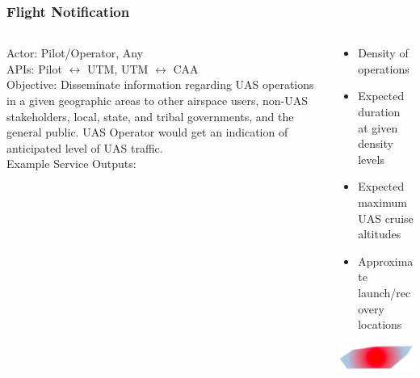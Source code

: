 \documentclass[usenames,dvipsnames,aspectratio=169,serif]{beamer}
\begin{document}
%
\begin{frame}
   \frametitle{Flight Notification}
   \begin{columns}[t]
      \begin{column}{0.5\textwidth}
         Actor: Pilot/Operator, Any \\
         APIs: Pilot $\leftrightarrow$ UTM, UTM $\leftrightarrow$ CAA \\
         Objective: Disseminate information regarding UAS operations in a given geographic areas to other airspace users, non-UAS stakeholders, local, state, and tribal governments, and the general public. UAS Operator would get an indication of anticipated level of UAS traffic. \\
         Example Service Outputs:
      \end{column}
      \begin{column}{0.5\textwidth}
         \begin{itemize}\small
         \item  Density of operations
         \item  Expected duration at given density levels
         \item  Expected maximum UAS cruise altitudes
         \item  Approximate launch/recovery locations
         \end{itemize}
         \includegraphics[height=0.35\textwidth]{img/flight-notification.png}
      \end{column}
   \end{columns}
\end{frame}
\end{document}
